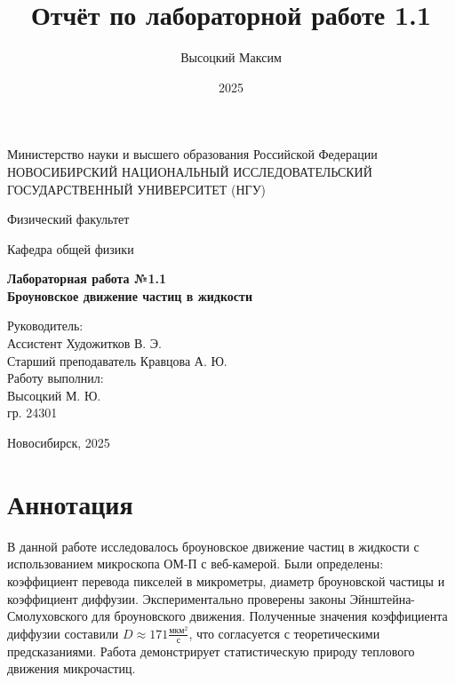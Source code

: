 \documentclass[a4paper,14pt]{article}
\author{Высоцкий Максим}
\title{Отчёт по лабораторной работе 1.1}
\date{2025}
\begin{document}
    \begin{titlepage}
        \begin{center}
            Министерство науки и высшего образования Российской Федерации \\
            НОВОСИБИРСКИЙ НАЦИОНАЛЬНЫЙ ИССЛЕДОВАТЕЛЬСКИЙ \\
            ГОСУДАРСТВЕННЫЙ УНИВЕРСИТЕТ (НГУ)
        \end{center}
        
        \begin{center}
            Физический факультет
        \end{center}
        
        \begin{center}
            Кафедра общей физики
        \end{center}
        
        \vspace{7cm}
        \begin{center}
            \textbf{Лабораторная работа №1.1} \\
            \textbf{Броуновское движение частиц в жидкости}
        \end{center}
        
        \vspace{2cm}
        \begin{flushright}
            Руководитель: \\
            Ассистент Художитков В. Э. \\
            Старший преподаватель Кравцова А. Ю. \\
            \vspace{1cm}
            Работу выполнил: \\
            Высоцкий М. Ю. \\
            гр. 24301
        \end{flushright}
        
        \vspace{3cm}
        \begin{center}
            Новосибирск, 2025
        \end{center}
    \end{titlepage}
\thispagestyle{empty}
\section*{Аннотация}
В данной работе исследовалось броуновское движение частиц в жидкости с использованием микроскопа ОМ-П с веб-камерой. Были определены: коэффициент перевода пикселей в микрометры, диаметр броуновской частицы и коэффициент диффузии. Экспериментально проверены законы Эйнштейна-Смолуховского для броуновского движения. Полученные значения коэффициента диффузии составили $D \approx 171 \frac{\text{мкм}^2}{\text{с}}$, что согласуется с теоретическими предсказаниями. Работа демонстрирует статистическую природу теплового движения микрочастиц.
\end{document}
